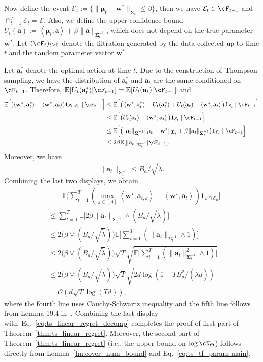 \documentclass[10pt]{article}
\renewcommand{\cO}{\mathcal{O}}
\newcommand{\<}{\left\langle}
\renewcommand{\>}{\right\rangle}
\newcommand{\bone}{{\mathbf 1}}
\newcommand{\E}{\mathbb{E}}
\newcommand{\Tpsmean}{{{\mathbf\mu}}}
\newcommand{\Tpscov}{{{\mathbf\Sigma}}}
\newcommand{\hpevent}{{\mathcal E}}
\newcommand{\tfparspace}{{\Theta}}
\def\ba{{\mathbf a}}
\def\bw{{\mathbf w}}
\begin{document}
Now define the event $\hpevent_t:=\{\|\Tpsmean_t-\bw^*\|_{\Tpscov_t}\leq\beta\}$,  then  we have $\hpevent_t\in\cF_{t-1}$  and $\cap_{t=1}^T \hpevent_t=\hpevent$. Also, we define the upper confidence bound $U_t(\ba):=\<\Tpsmean_t,\ba\>+\beta\|\ba\|_{\Tpscov_t^{-1}}$, which does not depend on the true parameter $\bw^*$. Let $(\cF_{t})_{t\geq 0}$ denote the filtration generated by the data collected up to time $t$ and the random parameter vector $\bw^*$.

Let $\ba_t^*$ denote the optimal action at time $t$. Due to the construction of Thompson sampling, we have the distribution of $\ba_t^*$ and $\ba_t$ are the same conditioned on $\cF_{t-1}$. Therefore, $\E[U_t(\ba_t^*)|\cF_{t-1}]=\E[U_t(\ba_t)|\cF_{t-1}]$ and
\begin{align*}
    \E\Big[ (\<\bw^\star,\ba_{t}^*\>-\<\bw^\star,\ba_{t}\>) \bone_{\hpevent\cap\hpevent_0}\mid\cF_{t-1}\Big]
   &\leq
\E\Big[ \big(\<\bw^\star,\ba_{t}^*\>-U_t(\ba_t^*)+U_t(\ba_t)-\<\bw^\star,\ba_{t}\>\big) \bone_{\hpevent_t}\mid\cF_{t-1}\Big]\\
    &\leq
  \E\Big[ \big(U_t(\ba_t)-\<\bw^\star,\ba_{t}\>\big) \bone_{\hpevent_t}\mid\cF_{t-1}\Big]\\
   &\leq
  \E\Big[ \big(\|\ba_t\|_{\Tpscov_t^{-1}}\|\Tpsmean_t-\bw^*\|_{\Tpscov_t} +\beta \|\ba_t\|_{\Tpscov_t^{-1}} \big)\bone_{\hpevent_t}\mid\cF_{t-1}\Big]\\
    &\leq
   2 \beta\E[\|\ba_t\|_{\Tpscov_t^{-1}}|\cF_{t-1}].
\end{align*}
Moreover, we have $$\|\ba_t\|_{\Tpscov_t^{-1}}\leq B_a/\sqrt{\tilde\lambda}.$$
Combining the last two displays, we obtain
\begin{align*}
     &\qquad\E\Big[\sum_{t=1}^T (\max_{j\in[A]}\<\bw^\star,\ba_{t,k}\>-\<\bw^\star,\ba_{t}\>) \bone_{\hpevent\cap\hpevent_0}\Big]\\
    &\leq\sum_{t=1}^T \E\Big[2 \beta \|\ba_t\|_{\Tpscov_t^{-1}}\wedge({B_a}/{\sqrt{\tilde\lambda}})\Big]\\
    &\leq
    2\big(\beta\vee ({B_a}/{\sqrt{\tilde\lambda}})\big)\E\Big[\sum_{t=1}^T (\|\ba_t\|_{\Tpscov_t^{-1}}\wedge1)\Big]\\
    &\leq
    2\big(\beta\vee ({B_a}/{\sqrt{\tilde\lambda}})\big)\sqrt{T}\sqrt{\E\Big[\sum_{t=1}^T (\|\ba_t\|^2_{\Tpscov_t^{-1}}\wedge1)\Big]}\\
    &\leq
    2\big(\beta\vee ({B_a}/{\sqrt{\tilde\lambda}})\big)\sqrt{T}\sqrt{2d\log(1+TB_a^2/(\tilde\lambda d))}\\
    &= \cO( d\sqrt{T}\log(Td)),
\end{align*}
where the  fourth line uses  Cauchy-Schwartz inequality and the fifth line follows from Lemma 19.4 in~\cite{lattimore2020bandit}. Combining the last display with~Eq.~\eqref{eq:ts_linear_regret_decomp} completes the proof of first part of Theorem~\ref{thm:ts_linear_regret}. Moreover, the second part of Theorem~\ref{thm:ts_linear_regret}  (i.e., the upper bound on $\log\cN_{\tfparspace}$) follows directly from Lemma~\ref{lm:cover_num_bound} and Eq.~\eqref{eq:ts_tf_param-main}.
\end{document}
